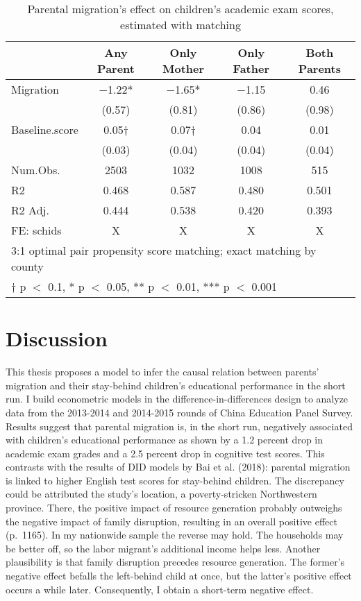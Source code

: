 \documentclass[
  man,floatsintext]{apa7}
\begin{document}
\begin{table}

\caption{Parental migration’s effect on children’s academic exam scores, estimated with matching}
\centering
\begin{tabular}[t]{lcccc}
\toprule
  & Any Parent & Only Mother & Only Father & Both Parents\\
\midrule
Migration & \num{-1.22}* & \num{-1.65}* & \num{-1.15} & \num{0.46}\\
 & (\num{0.57}) & (\num{0.81}) & (\num{0.86}) & (\num{0.98})\\
Baseline.score & \num{0.05}† & \num{0.07}† & \num{0.04} & \num{0.01}\\
 & (\num{0.03}) & (\num{0.04}) & (\num{0.04}) & (\num{0.04})\\
\midrule
Num.Obs. & \num{2503} & \num{1032} & \num{1008} & \num{515}\\
R2 & \num{0.468} & \num{0.587} & \num{0.480} & \num{0.501}\\
R2 Adj. & \num{0.444} & \num{0.538} & \num{0.420} & \num{0.393}\\
FE: schids & X & X & X & X\\
\bottomrule
\multicolumn{5}{l}{\rule{0pt}{1em}3:1 optimal pair propensity score matching; exact matching by county}\\
\multicolumn{5}{l}{\rule{0pt}{1em}† p $<$ 0.1, * p $<$ 0.05, ** p $<$ 0.01, *** p $<$ 0.001}\\
\end{tabular}
\end{table}

\newpage

\hypertarget{discussion}{%
\section{Discussion}\label{discussion}}

This thesis proposes a model to infer the causal relation between parents' migration and their stay-behind children's educational performance in the short run. I build econometric models in the difference-in-differences design to analyze data from the 2013-2014 and 2014-2015 rounds of China Education Panel Survey. Results suggest that parental migration is, in the short run, negatively associated with children's educational performance as shown by a 1.2 percent drop in academic exam grades and a 2.5 percent drop in cognitive test scores. This contrasts with the results of DID models by Bai et al. (2018): parental migration is linked to higher English test scores for stay-behind children. The discrepancy could be attributed the study's location, a poverty-stricken Northwestern province. There, the positive impact of resource generation probably outweighs the negative impact of family disruption, resulting in an overall positive effect (p.~1165). In my nationwide sample the reverse may hold. The households may be better off, so the labor migrant's additional income helps less. Another plausibility is that family disruption precedes resource generation. The former's negative effect befalls the left-behind child at once, but the latter's positive effect occurs a while later. Consequently, I obtain a short-term negative effect.
\end{document}
